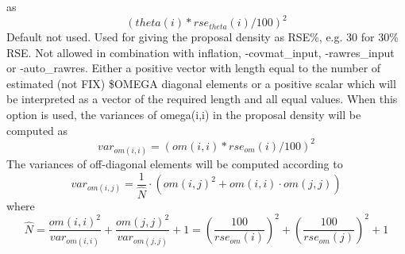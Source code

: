 \begin{optionlist}
as 
\[
\left(theta(i)*rse_{theta}(i)/100\right)^2
\]
\nextopt
{}
Default not used. Used for giving the proposal density as RSE\%, e.g. 30 for 30\% RSE.
Not allowed in combination with inflation, -covmat\_input, -rawres\_input or -auto\_rawres.
Either a positive vector with length equal to the number of estimated (not FIX) \$OMEGA 
diagonal elements or a positive scalar which will be interpreted as a vector of the required 
length and all equal values. When this option is used, the variances of omega(i,i) in the 
proposal density will be computed as 
\[
var_{om(i,i)}=\left(om(i,i)*rse_{om}(i)/100\right)^2
\]
The variances of off-diagonal elements will be computed according to
\[
var_{om(i,j)}= \frac{1}{\hat{N}} \cdot \left(om(i,j)^2 + om(i,i)\cdot om(j,j) \right)
\]
where
\[
\hat{N} = \frac{om(i,i)^2}{var_{om(i,i)}}+\frac{om(j,j)^2}{var_{om(j,j)}}+1 =\left(\frac{100}{rse_{om}(i)}\right)^2+\left(\frac{100}{rse_{om}(j)}\right)^2+1
\]


\end{optionlist}
